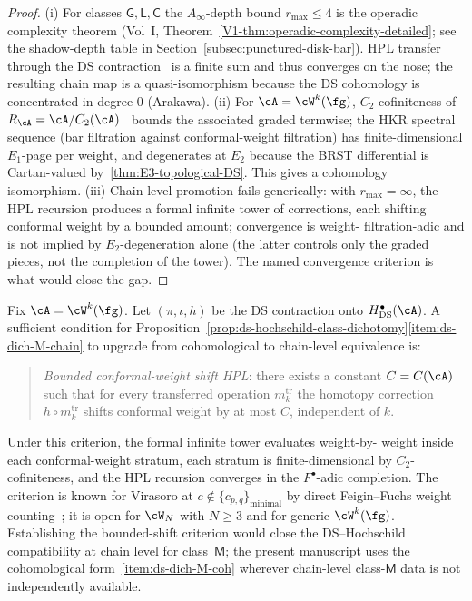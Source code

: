 \begin{proof}
(i) For classes $\mathsf{G},\mathsf{L},\mathsf{C}$ the $A_\infty$-depth
bound $r_{\max}\le 4$ is the operadic complexity theorem (Vol~I,
Theorem~\ref*{V1-thm:operadic-complexity-detailed}; see the shadow-depth
table in Section~\ref{subsec:punctured-disk-bar}). HPL transfer through
the DS contraction~\cite{Arakawa15} is a finite sum and thus converges
on the nose; the resulting chain map is a quasi-isomorphism because the
DS cohomology is concentrated in degree $0$ (Arakawa).
(ii) For $\cA=\cW^k(\fg)$, $C_2$-cofiniteness of
$R_{\cA}=\cA/C_2(\cA)$~\cite{Arakawa15} bounds the associated graded
termwise; the HKR spectral sequence (bar filtration against
conformal-weight filtration) has finite-dimensional $E_1$-page per
weight, and degenerates at $E_2$ because the BRST differential is
Cartan-valued by~\ref{thm:E3-topological-DS}. This gives a cohomology
isomorphism.
(iii) Chain-level promotion fails generically: with $r_{\max}=\infty$,
the HPL recursion produces a formal infinite tower of corrections, each
shifting conformal weight by a bounded amount; convergence is weight-
filtration-adic and is not implied by $E_2$-degeneration alone (the
latter controls only the graded pieces, not the completion of the
tower). The named convergence criterion is what would close the gap.
\end{proof}

\begin{remark}%
\label{rem:class-M-hpl-convergence}%
%
Fix $\cA=\cW^k(\fg)$. Let $(\pi,\iota,h)$ be the DS contraction onto
$H^\bullet_{\mathrm{DS}}(\cA)$. A sufficient condition for
Proposition~\ref{prop:ds-hochschild-class-dichotomy}\ref{item:ds-dich-M-chain}
to upgrade from cohomological to chain-level equivalence is:
\begin{quote}
\emph{Bounded conformal-weight shift HPL}: there exists a constant
$C=C(\cA)$ such that for every transferred operation
$m_k^{\mathrm{tr}}$ the homotopy correction $h\circ m_k^{\mathrm{tr}}$
shifts conformal weight by at most $C$, independent of $k$.
\end{quote}
Under this criterion, the formal infinite tower evaluates weight-by-
weight inside each conformal-weight stratum, each stratum is
finite-dimensional by $C_2$-cofiniteness, and the HPL recursion
converges in the $F^\bullet$-adic completion. The criterion is known
for Virasoro at $c\notin\{c_{p,q}\}_{\mathrm{minimal}}$ by direct
Feigin--Fuchs weight counting~\cite{FeiginFuchs90}; it is open for
$\cW_N$ with $N\ge 3$ and for generic $\cW^k(\fg)$. Establishing the
bounded-shift criterion would close the DS--Hochschild compatibility
at chain level for class~$\mathsf{M}$; the present manuscript uses the
cohomological form~\ref{item:ds-dich-M-coh} wherever chain-level
class-$\mathsf{M}$ data is not independently available.
\end{remark}

